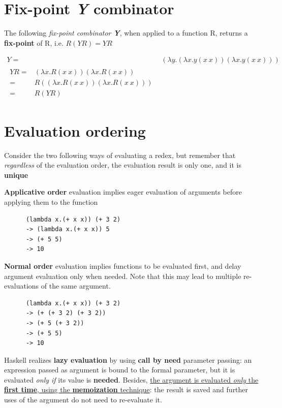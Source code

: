 \section{Fix-point \textit{Y} combinator}

The following \textit{fix-point combinator \textbf{Y}}, when applied to a function R,
returns a \textbf{fix-point} of R, i.e. $R(YR) = YR$

\begin{align}
   Y =& (\lambda y.(\lambda x.y(x\ x))(\lambda x.y(x\ x)))\\
   \begin{split}
      YR =& (\lambda x.R(x\ x))(\lambda x.R(x\ x))\\
         =& R((\lambda x.R(x\ x))(\lambda x.R(x\ x)))\\
         =& R(YR)
   \end{split}
\end{align}

\section{Evaluation ordering}
Consider the two following ways of evaluating a redex,
but remember that \textit{regardless} of the evaluation order,
the evaluation result is only one,
and it is \textbf{unique}\footnotemark
\begin{paracol}{2}
   \colfill
   \textbf{Applicative order} evaluation implies eager evaluation of arguments before applying them to the function
   \begin{lstlisting}
      (lambda x.(+ x x)) (+ 3 2)
      -> (lambda x.(+ x x)) 5
      -> (+ 5 5)
      -> 10
   \end{lstlisting}
   \colfill

   \switchcolumn
   \textbf{Normal order} evaluation implies functions to be evaluated first,
   and delay argument evaluation only when needed.
   Note that this may lead to multiple re-evaluations of the same argument.
   \begin{lstlisting}
      (lambda x.(+ x x)) (+ 3 2)
      -> (+ (+ 3 2) (+ 3 2))
      -> (+ 5 (+ 3 2))
      -> (+ 5 5)
      -> 10
   \end{lstlisting}
\end{paracol}
Haskell realizes \textbf{lazy evaluation} by using \textbf{call by need} parameter passing: 
an expression passed as
argument is bound to the formal parameter, but it is
evaluated \textit{only if} its value is \textbf{needed}.
Besides, 
\ul{the argument is evaluated \textit{only} the \textbf{first time}, using
the \textbf{memoization} technique}: the result is saved and
further uses of the argument do not need to re-evaluate it.

